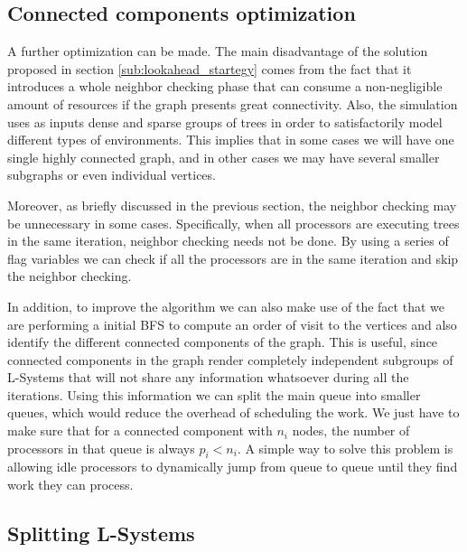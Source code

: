 \documentclass[letterpaper,twoside,11pt]{article}
\begin{document}
\begin{multicols}{2}

\subsection{Connected components optimization} %
\label{sub:connected_components}

A further optimization can be made. The main disadvantage of the solution proposed in section \ref{sub:lookahead_startegy} comes from the fact that it introduces a whole neighbor checking phase that can consume a non-negligible amount of resources if the graph presents great connectivity. Also, the simulation uses as inputs dense and sparse groups of trees in order to satisfactorily model different types of environments. This implies that in some cases we will have one single highly connected graph, and in other cases we may have several smaller subgraphs or even individual vertices.

Moreover, as briefly discussed in the previous section, the neighbor checking may be unnecessary in some cases. Specifically, when all processors are executing trees in the same iteration, neighbor checking needs not be done. By using a series of flag variables we can check if all the processors are in the same iteration and skip the neighbor checking.

In addition, to improve the algorithm we can also make use of the fact that we are performing a initial BFS to compute an order of visit to the vertices and also identify the different connected components of the graph. This is useful, since connected components in the graph render completely independent subgroups of L-Systems that will not share any information whatsoever during all the iterations. Using this information we can split the main queue into smaller queues, which would reduce the overhead of scheduling the work. We just have to make sure that for a connected component with $n_i$ nodes, the number of processors in that queue is always $p_i < n_i$. A simple way to solve this problem is allowing idle processors to dynamically jump from queue to queue until they find work they can process.


\subsection{Splitting L-Systems} %
\label{sub:splitting_l_systems}


\end{multicols}
\end{document}
